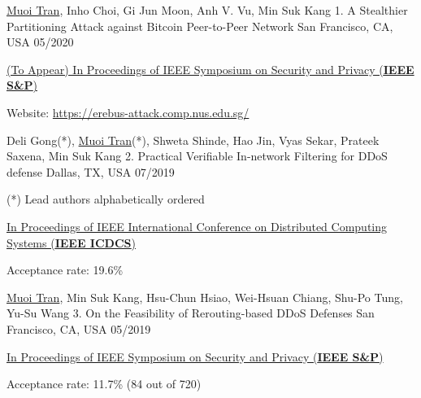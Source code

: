 


\begin{cventries}

  \cventry
    {\underline{Muoi Tran}, Inho Choi, Gi Jun Moon, Anh V. Vu, Min Suk Kang} %
    {1. A Stealthier Partitioning Attack against Bitcoin Peer-to-Peer Network} %
    {San Francisco, CA, USA} %
    {05/2020} %
    {
      \begin{cvitems} %
        \item {\href{https://www.ieee-security.org/TC/SP2020/}{(To Appear) In Proceedings of IEEE Symposium on Security and Privacy (\textbf{IEEE S\&P})}}
        \item Website: \url{https://erebus-attack.comp.nus.edu.sg/}
      \end{cvitems}
    }

  \cventry
    {Deli Gong(*), \underline{Muoi Tran}(*), Shweta Shinde, Hao Jin, Vyas Sekar, Prateek Saxena, Min Suk Kang} %
    {2. Practical Verifiable In-network Filtering for DDoS defense} %
    {Dallas, TX, USA}
    {07/2019}
    {
      \begin{cvitems} %
        \item {(*) Lead authors alphabetically ordered}
        \item {\href{https://theory.utdallas.edu/ICDCS2019/}{In Proceedings of IEEE International Conference on Distributed Computing Systems (\textbf{IEEE ICDCS})}}
        \item {Acceptance rate: 19.6\%}
      \end{cvitems}
    }

  \cventry
    {\underline{Muoi Tran}, Min Suk Kang, Hsu-Chun Hsiao, Wei-Hsuan Chiang, Shu-Po Tung, Yu-Su Wang} %
    {3. On the Feasibility of Rerouting-based DDoS Defenses } %
    {San Francisco, CA, USA} %
    {05/2019} %
    {
      \begin{cvitems} %
        \item {\href{https://www.ieee-security.org/TC/SP2019/}{In Proceedings of IEEE Symposium on Security and Privacy (\textbf{IEEE S\&P})}}
        \item {Acceptance rate: 11.7\% (84 out of 720) }
      \end{cvitems}
    }


\end{cventries}
